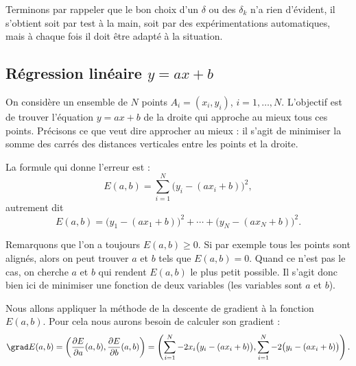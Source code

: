 Terminons par rappeler que le bon choix d'un $\delta$ ou des $\delta_k$ n'a rien d'évident, il s'obtient soit par test à la main, soit par des expérimentations automatiques, mais à chaque fois il doit être adapté à la situation.



\subsection{Régression linéaire $y=ax+b$}


On considère un ensemble de $N$ points $A_i = (x_i,y_i)$, $i=1,\ldots,N$.
L'objectif est de trouver l'équation $y=ax+b$ de la droite qui approche au mieux tous ces points. Précisons ce que veut dire \og{}approcher au mieux\fg{} : il s'agit de minimiser la somme des carrés des distances verticales entre les points et la droite.



La formule qui donne l'erreur est :
$$E(a,b) = \sum_{i=1}^{N}\big(y_i - (ax_i+b)\big)^2,$$
autrement dit 
$$E(a,b) = \big(y_1 - (ax_1+b)\big)^2 + \cdots + \big(y_N - (ax_N+b)\big)^2.$$

Remarquons que l'on a toujours $E(a,b)\ge0$. Si par exemple tous les points sont alignés, alors on peut trouver $a$ et $b$ tels que $E(a,b)=0$. Quand ce n'est pas le cas, on cherche $a$ et $b$ qui rendent $E(a,b)$ le plus petit possible.
Il s'agit donc bien ici de minimiser une fonction de deux variables (les variables sont $a$ et $b$).

Nous allons appliquer la méthode de la descente de gradient à la fonction $E(a,b)$. Pour cela nous aurons besoin de calculer son gradient :
$$\grad E(a,b) 
= \left(\frac{\partial E}{\partial a}(a,b), \frac{\partial E}{\partial b}(a,b)\right)
= \left(
\sum_{i=1}^{N} -2x_i\big(y_i - (ax_i+b)\big),  
\sum_{i=1}^{N} -2\big(y_i - (ax_i+b)\big)
\right).$$


